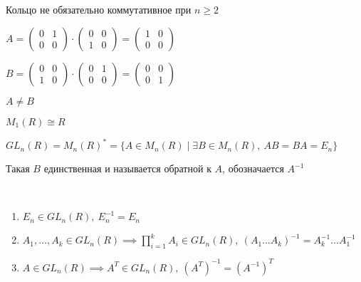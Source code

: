 \begin{notice}
    Кольцо не обязательно коммутативное при $n \geq 2$

    $A = \begin{pmatrix}
        0 & 1 \\
        0 & 0
    \end{pmatrix} \cdot \begin{pmatrix}
        0 & 0 \\
        1 & 0
    \end{pmatrix} = \begin{pmatrix}
        1 & 0 \\
        0 & 0
    \end{pmatrix}$
    
    $B = \begin{pmatrix}
        0 & 0 \\
        1 & 0
    \end{pmatrix} \cdot \begin{pmatrix}
        0 & 1 \\
        0 & 0
    \end{pmatrix} = \begin{pmatrix}
        0 & 0 \\
        0 & 1
    \end{pmatrix}$

    $A \neq B$
\end{notice}

\begin{notice}
    $M_1(R) \cong R$
\end{notice}

\begin{defn}
    $GL_n(R) = M_n(R)^* = \{A \in M_n(R) \mid \exists B \in M_n(R),~ AB = BA = E_n\}$

    Такая $B$ единственная и называется обратной к $A$, обозначается $A^{-1}$
\end{defn}

\begin{theorem-non}~

    \begin{enumerate}
        \item $E_n \in GL_n(R),~ E_n^{-1} = E_n$
        
        \item $A_1, \ldots, A_k \in GL_n(R) \implies \prod\limits_{i = 1}^k A_i \in GL_n(R),~ (A_1 \ldots A_k)^{-1} = A_k^{-1} \ldots A_1^{-1}$
        
        \item $A \in GL_n(R) \implies A^T \in GL_n(R),~ (A^T)^{-1} = (A^{-1})^T$
    \end{enumerate}
\end{theorem-non}

